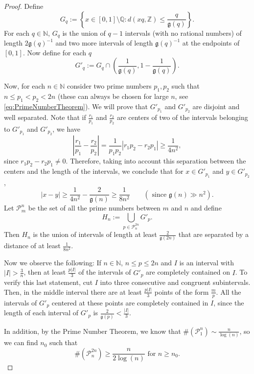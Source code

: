 \documentclass[11pt,a4paper]{amsart}
\begin{document}
\begin{proof}
Define
\begin{equation}
 G_q:=\left\{x\in [0,1]\setminus {\mathbb{Q}}: d(xq,\mathbb Z)\le \frac{q}{{\mathfrak{g}}(q)}\right\}.
\end{equation}
For each $q\in{\mathbb{N}}$, $G_q$ is the union of $q-1$ intervals (with no rational numbers) of
length $2{\mathfrak{g}}(q)^{-1}$ and two more intervals of length
${\mathfrak{g}}(q)^{-1}$ at the endpoints of $[0,1]$.
Now define for each $q$
\[
G'_q:=G_q\cap \left(\frac{1}{{\mathfrak{g}}(q)},1-\frac{1}{{\mathfrak{g}}(q)}\right).
\]

Now, for each $n\in{\mathbb{N}}$ consider two prime numbers $p_1, p_2$ such
that $n\le p_1<p_2<2n$ (these can always be chosen for large $n$, see \eqref{eq:PrimeNumberTheorem}). We will prove that $G'_{p_1}$ and
$G'_{p_2}$ are disjoint and well separated. Note that if
$\frac{r_1}{p_1}$ and $\frac{r_2}{p_2}$ are centers of two of the
intervals belonging to $G'_{p_1}$ and $G'_{p_2}$, we have
\[
 \left|\frac{r_1}{p_1}-\frac{r_2}{p_2}\right|=\frac{1}{p_1p_2}|r_1p_2-r_2p_1|\ge\frac{1}{4n^2},
\]
since $r_1p_2-r_2p_1\neq 0$. Therefore, taking into account this
separation between the centers and the length of the intervals,
we conclude that for $x\in G'_{p_1}$ and $y\in G'_{p_2}$,
\[
 |x-y|\ge \frac{1}{4n^2}-\frac{2}{{\mathfrak{g}}(n)}\ge \frac{1}{8n^2}\qquad(\text{ since }{\mathfrak{g}}(n)\gg n^2).
\]
Let $\mathcal{P}_m^n$ be the set of all the prime numbers between
$m$ and $n$ and define
\[
    H_n:=\bigcup_{p\in\mathcal{P}_n^{2n}}G'_p.
\]
Then $H_n$ is the union of intervals of length at least
$\frac{2}{{\mathfrak{g}}(2n)}$ that are separated by a distance of at least
$\frac{1}{8n^2}$.

Now we observe the following: If $n\in\mathbb N$, $n\le p\le 2n$ and $I$ is an interval with
$|I|>\frac{3}{n}$, then at least $\frac{p|I|}{3}$ of the
intervals of $G'_p$ are completely contained on $I$. To verify
this last statement, cut $I$ into three consecutive and congruent
subintervals. Then, in the middle interval there are at least
$\frac{p|I|}{3}$ points of the form $\frac{m}{p}$. All the
intervals of $G'_p$ centered at these points are completely
contained in $I$, since the length of each interval of $G'_p$ is
$\frac{2}{{\mathfrak{g}}(p)}<\frac{|I|}{3}$.

In addition, by the Prime Number Theorem, we know that
$\#(\mathcal{P}_1^n)\sim\frac{n}{\log(n)}$, so we can find $n_0$
such that
\begin{equation}\label{eq:PrimeNumberTheorem}
\#(\mathcal{P}_n^{2n}) \ge \frac{n}{2\log(n)} \text{ for } n\ge
n_0.
\end{equation}


\end{proof}
\end{document}
